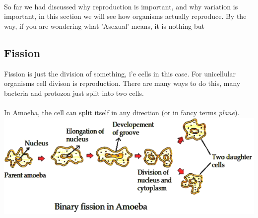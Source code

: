 \documentclass[A4]{article}
\begin{document}
     \paragraph{}
     So far we had discussed why reproduction is important, and why variation is important, in this section we will see how organisms actually reproduce.
     By the way, if you are wondering what 'Asexual' means, it is nothing but 
     \subsection*{Fission}
     Fission is just the division of something, i'e cells in this case. 
     For unicellular organisms cell divison is reproduction.
     There are many ways to do this, many bacteria and protozoa just split into two cells.
     \paragraph{}
     In Amoeba, the cell can split itself in any direction (or in fancy terms \emph{plane}).
     \includegraphics[scale=0.5]{Binary-fission-in-amoeba.png}
\end{document}
